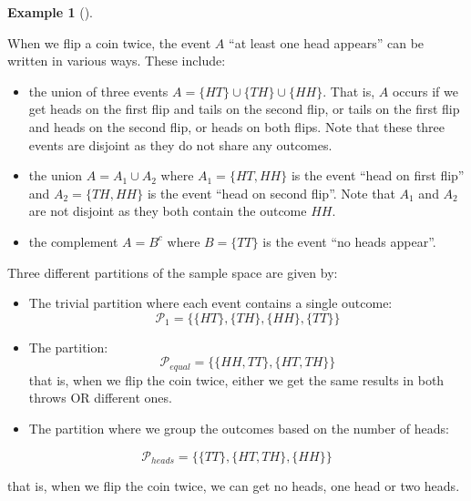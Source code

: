 \documentclass[
  letterpaper,
  DIV=11,
  numbers=noendperiod]{scrreport}
\theoremstyle{definition}
\newtheorem{example}{Example}[chapter]
\theoremstyle{plain}
\theoremstyle{definition}
\theoremstyle{plain}
\theoremstyle{remark}
\begin{document}
\begin{tcolorbox}[enhanced jigsaw, breakable, opacityback=0, leftrule=.75mm, colback=white, bottomtitle=1mm, coltitle=black, toptitle=1mm, titlerule=0mm, bottomrule=.15mm, colframe=quarto-callout-note-color-frame, title={Representation of events using set operations}, opacitybacktitle=0.6, colbacktitle=quarto-callout-note-color!10!white, rightrule=.15mm, arc=.35mm, toprule=.15mm, left=2mm]

\begin{example}[]\protect\hypertarget{exm-union}{}\label{exm-union}

When we flip a coin twice, the event \(A\) ``at least one head appears''
can be written in various ways. These include:

\begin{itemize}
\item
  the union of three events \(A = \{HT\} \cup \{TH\} \cup \{HH\}\). That
  is, \(A\) occurs if we get heads on the first flip and tails on the
  second flip, or tails on the first flip and heads on the second flip,
  or heads on both flips. Note that these three events are disjoint as
  they do not share any outcomes.
\item
  the union \(A = A_1 \cup A_2\) where \(A_1 = \{HT, HH\}\) is the event
  ``head on first flip'' and \(A_2 = \{TH, HH\}\) is the event ``head on
  second flip''. Note that \(A_1\) and \(A_2\) are not disjoint as they
  both contain the outcome \(HH\).
\item
  the complement \(A = B^c\) where \(B = \{TT\}\) is the event ``no
  heads appear''.
\end{itemize}

Three different partitions of the sample space are given by:

\begin{itemize}
\item
  The trivial partition where each event contains a single outcome: \[
  \mathcal P_1=\{\{HT\},\{TH\},\{HH\},\{TT\}\}
  \]
\item
  The partition: \[
  \mathcal P_{equal}=\{\{HH,TT\}, \{HT,TH\}\}
  \] that is, when we flip the coin twice, either we get the same
  results in both throws OR different ones.
\item
  The partition where we group the outcomes based on the number of
  heads:
\end{itemize}

\[
\mathcal P_{heads} =\{\{TT\}, \{HT,TH\}, \{HH\}\}
\]

that is, when we flip the coin twice, we can get no heads, one head or
two heads.

\end{example}

\end{tcolorbox}
\end{document}
